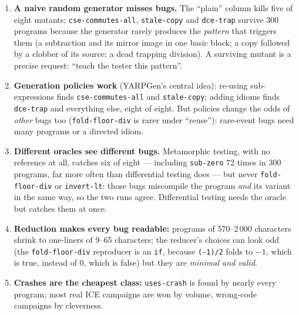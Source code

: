 \documentclass[10pt,a4paper,openany,oneside]{report}
\begin{document}
\begin{mustbox}
\begin{enumerate}[nosep]
\item \textbf{A naive random generator misses bugs.} The ``plain'' column kills five of eight mutants; \texttt{cse-commutes-all}, \texttt{stale-copy} and \texttt{dce-trap} survive 300 programs because the generator rarely produces the \emph{pattern} that triggers them (a subtraction and its mirror image in one basic block; a copy followed by a clobber of its source; a dead trapping division). A surviving mutant is a precise request: ``teach the tester this pattern''.
\item \textbf{Generation policies work} (YARPGen's central idea): re-using sub-expressions finds \texttt{cse-commutes-all} and \texttt{stale-copy}; adding idioms finds \texttt{dce-trap} and everything else, eight of eight. But policies change the odds of \emph{other} bugs too (\texttt{fold-floor-div} is rarer under ``reuse''): rare-event bugs need many programs or a directed idiom.
\item \textbf{Different oracles see different bugs.} Metamorphic testing, with no reference at all, catches six of eight --- including \texttt{sub-zero} 72 times in 300 programs, far more often than differential testing does --- but never \texttt{fold-floor-div} or \texttt{invert-lt}: those bugs miscompile the program \emph{and} its variant in the same way, so the two runs agree. Differential testing needs the oracle but catches them at once.
\item \textbf{Reduction makes every bug readable:} programs of 570--2\,000 characters shrink to one-liners of 9--65 characters; the reducer's choices can look odd (the \texttt{fold-floor-div} reproducer is an \texttt{if}, because \texttt{(-1)/2} folds to $-1$, which is true, instead of $0$, which is false) but they are \emph{minimal and valid}.
\item \textbf{Crashes are the cheapest class:} \texttt{uses-crash} is found by nearly every program; most real ICE campaigns are won by volume, wrong-code campaigns by cleverness.
\end{enumerate}
\end{mustbox}


\end{document}
